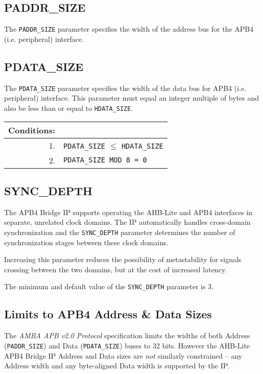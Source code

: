 \subsection{PADDR\_SIZE}\label{paddr_size}

The \texttt{PADDR\_SIZE} parameter specifies the width of the address bus for the
APB4 (i.e. peripheral) interface.

\subsection{PDATA\_SIZE}\label{pdata_size}

The \texttt{PDATA\_SIZE} parameter specifies the width of the data bus for APB4
(i.e. peripheral) interface. This parameter must equal an integer
multiple of bytes and also be less than or equal to \texttt{HDATA\_SIZE}.

\begin{longtable}[]{@{}|rp{12cm}@{}}
	\textbf{Conditions}: &  \\
	\endhead
	1. & \texttt{PDATA\_SIZE} $\leqslant$ \texttt{HDATA\_SIZE}\\
	2. & \texttt{PDATA\_SIZE MOD 8 = 0}\\
\end{longtable}	

\subsection{SYNC\_DEPTH}\label{sync_depth}

The APB4 Bridge IP supports operating the AHB-Lite and APB4 interfaces
in separate, unrelated clock domains. The IP automatically handles
cross-domain synchronization and the \texttt{SYNC\_DEPTH} parameter determines
the number of synchronization stages between these clock domains.

Increasing this parameter reduces the possibility of metastability for
signals crossing between the two domains, but at the cost of increased
latency.

The minimum and default value of the \texttt{SYNC\_DEPTH} parameter is 3.

\subsection{Limits to APB4 Address \& Data Sizes} \label{limits-to-apb4-address-data-sizes}

The \emph{AMBA APB v2.0 Protocol} specification limits the widths of
both Address (\texttt{PADDR\_SIZE}) and Data (\texttt{PDATA\_SIZE}) buses to 32 bits.
However the AHB-Lite APB4 Bridge IP Address and Data sizes are
\emph{not} similarly constrained -- any Address width and any
byte-aligned Data width is supported by the IP.
